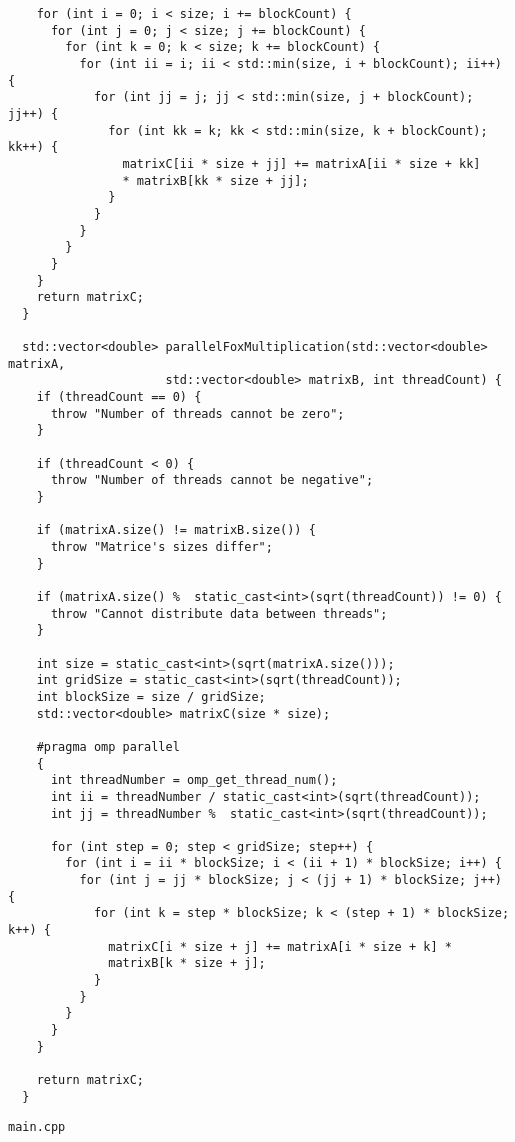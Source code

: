 \documentclass{article}
\begin{document}
\begin{lstlisting}
    for (int i = 0; i < size; i += blockCount) {
      for (int j = 0; j < size; j += blockCount) {
        for (int k = 0; k < size; k += blockCount) {
          for (int ii = i; ii < std::min(size, i + blockCount); ii++) {
            for (int jj = j; jj < std::min(size, j + blockCount); jj++) {
              for (int kk = k; kk < std::min(size, k + blockCount); kk++) {
                matrixC[ii * size + jj] += matrixA[ii * size + kk]
                * matrixB[kk * size + jj];
              }
            }
          }
        }
      }
    }
    return matrixC;
  }

  std::vector<double> parallelFoxMultiplication(std::vector<double> matrixA,
                      std::vector<double> matrixB, int threadCount) {
    if (threadCount == 0) {
      throw "Number of threads cannot be zero";
    }

    if (threadCount < 0) {
      throw "Number of threads cannot be negative";
    }

    if (matrixA.size() != matrixB.size()) {
      throw "Matrice's sizes differ";
    }

    if (matrixA.size() %  static_cast<int>(sqrt(threadCount)) != 0) {
      throw "Cannot distribute data between threads";
    }

    int size = static_cast<int>(sqrt(matrixA.size()));
    int gridSize = static_cast<int>(sqrt(threadCount));
    int blockSize = size / gridSize;
    std::vector<double> matrixC(size * size);

    #pragma omp parallel
    {
      int threadNumber = omp_get_thread_num();
      int ii = threadNumber / static_cast<int>(sqrt(threadCount));
      int jj = threadNumber %  static_cast<int>(sqrt(threadCount));

      for (int step = 0; step < gridSize; step++) {
        for (int i = ii * blockSize; i < (ii + 1) * blockSize; i++) {
          for (int j = jj * blockSize; j < (jj + 1) * blockSize; j++) {
            for (int k = step * blockSize; k < (step + 1) * blockSize; k++) {
              matrixC[i * size + j] += matrixA[i * size + k] *
              matrixB[k * size + j];
            }
          }
        }
      }
    }

    return matrixC;
  }
\end{lstlisting}
\par
\lstinline$main.cpp$
\end{document}
